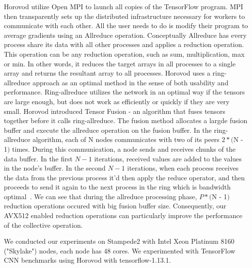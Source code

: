 \documentclass[sigconf]{acmart}
\begin{document}
Horovod utilize Open MPI to launch all copies of the TensorFlow program. MPI then transparently sets up the distributed infrastructure necessary for workers to communicate with each other. All the user needs to do is
modify their program to average gradients using an Allreduce operation. Conceptually Allreduce has every process share its data with all other processes and applies a reduction operation. This operation can be any reduction operation, such as sum, multiplication, max or min. In other words, it reduces the target arrays in all processes
to a single array and returns the resultant array to all processes. Horovod uses a ring-allreduce approach as an optimal method in the sense of both usability and performance.
Ring-allreduce utilizes the network in an optimal way if the tensors are large enough, but does not
work as efficiently or quickly if they are very small. Horovod introduced Tensor Fusion - an algorithm that fuses tensors together before it calls ring-allreduce. The fusion method allocates a largde fusion buffer and execute the allreduce operation on the fusion buffer.
In the ring-allreduce algorithm, each of N nodes communicates with two of its
peers $2 * ($N - 1$)$ times. During this communication, a node sends and receives chunks of the data
buffer. In the first $N - 1$ iterations, received values are added to the values in the node's buffer. In
the second $N - 1$ iterations, when each process receives the data from the previous process it'd then
apply the reduce operator, and then proceeds to send it again to the next process in the ring which is bandwidth optimal~\cite{allreduce-optimal}. We can see that during the allreduce processing phase, $P * ($N - 1$)$ reduction operations occured with big fusion buffer size. Consequently, our AVX512 enabled reduction operations can particularly improve the performance of the collective operation.

We conducted our experiments on Stampede2 with Intel Xeon Platinum 8160 ("Skylake") nodes, each node has 48 cores.
We experimented with TensorFlow CNN benchmarks using Horovod with tensorflow-1.13.1.
\end{document}
